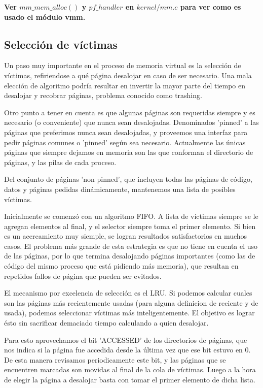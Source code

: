 \textbf{Ver $mm\_mem\_alloc()$ y $pf\_handler$ en $kernel/mm.c$ para ver como es
    usado el módulo vmm.}

\subsection{Selección de víctimas}

Un paso muy importante en el proceso de memoria virtual es la selección de
víctimas, refiriendose a qué página desalojar en caso de ser necesario. Una mala
elección de algoritmo podría resultar en invertir la mayor parte del tiempo en
desalojar y recobrar páginas, problema conocido como trashing.

Otro punto a tener en cuenta es que algunas páginas son requeridas siempre y es
necesario (o conveniente) que nunca sean desalojadas. Denominados 'pinned' a las
páginas que preferimos nunca sean desalojadas, y proveemos una interfaz para
pedir páginas comunes o 'pinned' según sea necesario. Actualmente las únicas
páginas que siempre dejamos en memoria son las que conforman el directorio de
páginas, y las pilas de cada proceso.

Del conjunto de páginas 'non pinned', que incluyen todas las páginas de
código, datos y páginas pedidas dinámicamente, mantenemos una lista de posibles
víctimas.

Inicialmente se comenzó con un algoritmo FIFO. A lista de víctimas
siempre se le agregan elementos al final, y el selector siempre toma el primer
elemento. Si bien es un acercamiento muy siemple, se logran resultados
satisfactorios en muchos casos. El problema más grande de esta estrategia es que
no tiene en cuenta el uso de las páginas, por lo que termina desalojando páginas
importantes (como las de código del mismo proceso que está pidiendo más
memoria), que resultan en repetidos fallos de página que pueden ser evitados.

El mecanismo por excelencia de selección es el LRU. Si podemos calcular cuales
son las páginas más recientemente usadas (para alguna definicion de reciente y
de usada), podemos seleccionar víctimas más inteligentemente. El objetivo es
lograr ésto sin sacrificar demaciado tiempo calculando a quien desalojar.

Para esto aprovechamos el bit 'ACCESSED' de los directorios de páginas, que nos
indica si la página fue accedida desde la última vez que ese bit estuvo en 0. De
esta manera revisamos periodicamente este bit, y las páginas que se encuentren
marcadas son movidas al final de la cola de víctimas. Luego a la hora de elegir
la página a desalojar basta con tomar el primer elemento de dicha lista.

